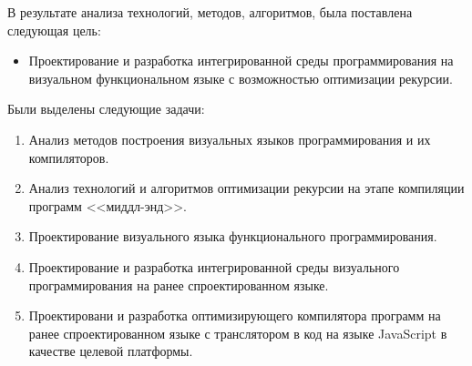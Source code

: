 В результате анализа технологий, методов, алгоритмов, была поставлена следующая цель:

\begin{itemize}
    \item Проектирование и разработка интегрированной среды программирования на визуальном функциональном языке с возможностью оптимизации рекурсии.
\end{itemize}

Были выделены следующие задачи:

\begin{enumerate}
    \item Анализ методов построения визуальных языков программирования и их компиляторов.
    \item Анализ технологий и алгоритмов оптимизации рекурсии на этапе компиляции программ <<миддл-энд>>.
    \item Проектирование визуального языка функционального программирования.
    \item Проектирование и разработка интегрированной среды визуального программирования на ранее спроектированном языке.
    \item Проектировани и разработка оптимизирующего компилятора программ на ранее спроектированном языке с транслятором в код на языке JavaScript в качестве целевой платформы.
\end{enumerate}

\nocite{*}

\FloatBarrier